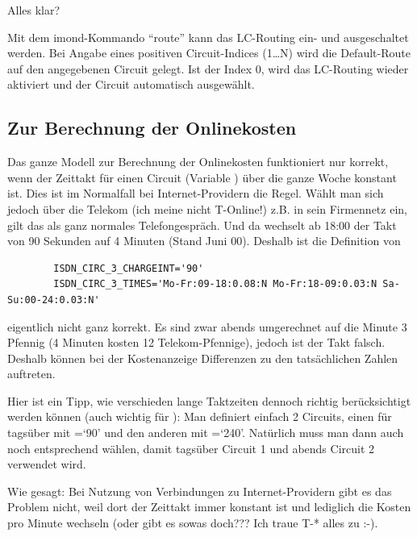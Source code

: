   Alles klar?

  Mit dem imond-Kommando ``route'' kann das LC-Routing ein- und
  ausgeschaltet werden. Bei Angabe eines positiven Circuit-Indices
  (1\ldots N) wird die Default-Route auf den angegebenen Circuit
  gelegt. Ist der Index 0, wird das LC-Routing wieder aktiviert und
  der Circuit automatisch ausgewählt.


  \subsection{Zur Berechnung der Onlinekosten}

  Das ganze Modell zur Berechnung der Onlinekosten funktioniert nur
  korrekt, wenn der Zeittakt für einen Circuit (Variable
  ) über die ganze Woche konstant ist. Dies
  ist im Normalfall bei Internet-Providern die Regel. Wählt man sich
  jedoch über die Telekom (ich meine nicht T-Online!) z.B. in sein
  Firmennetz ein, gilt das als ganz normales Telefongespräch. Und da
  wechselt ab 18:00 der Takt von 90 Sekunden auf 4 Minuten (Stand Juni
  00). Deshalb ist die Definition von

\begin{example}
\begin{verbatim}
        ISDN_CIRC_3_CHARGEINT='90'
        ISDN_CIRC_3_TIMES='Mo-Fr:09-18:0.08:N Mo-Fr:18-09:0.03:N Sa-Su:00-24:0.03:N'
\end{verbatim}
\end{example}

  eigentlich nicht ganz korrekt. Es sind zwar abends umgerechnet auf
  die Minute 3 Pfennig (4 Minuten kosten 12 Telekom-Pfennige), jedoch
  ist der Takt falsch. Deshalb können bei der Kostenanzeige
  Differenzen zu den tatsächlichen Zahlen auftreten.

  Hier ist ein Tipp, wie verschieden lange Taktzeiten dennoch richtig
  berücksichtigt werden können (auch wichtig für
  ): Man definiert einfach 2 Circuits,
  einen für tagsüber mit =`90' und den
  anderen mit =`240'.
  Natürlich muss man dann auch noch 
  entsprechend wählen, damit tagsüber Circuit 1 und abends Circuit 2
  verwendet wird.

  Wie gesagt: Bei Nutzung von Verbindungen zu Internet-Providern gibt
  es das Problem nicht, weil dort der Zeittakt immer konstant ist und
  lediglich die Kosten pro Minute wechseln (oder gibt es sowas doch???
  Ich traue T-* alles zu :-).

